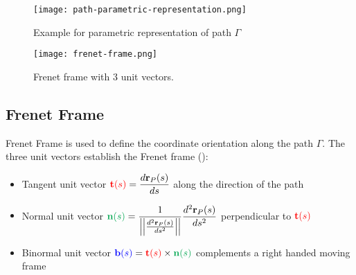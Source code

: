 \begin{figure}[hbt!]
	\centering
	\begin{minipage}{0.45\textwidth}
		\centering
		\texttt{[image: path-parametric-representation.png]}
		\caption{Example for parametric representation of path $\Gamma$}
		\label{fig:path-parametric-representation}
	\end{minipage}\hfill
	\begin{minipage}{0.45\textwidth}
		\centering
		\texttt{[image: frenet-frame.png]}
		\caption{Frenet frame with 3 unit vectors.}
		\label{fig:frenet-frame}
	\end{minipage}
\end{figure}

\subsection{Frenet Frame}
Frenet Frame is used to define the coordinate orientation along the path $\Gamma$. The three unit vectors establish the Frenet frame ():
\begin{itemize}
	\item Tangent unit vector $\displaystyle {\color{red} \textbf{t}(s)} = \frac{d\textbf{r}_P(s)}{ds} $ along the direction of the path
	\item Normal unit vector $\displaystyle {\color{Green} \textbf{n}(s)} = \frac{1}{\left|\left| \frac{d^2 \textbf{r}_P(s)}{ds^2} \right| \right|} \frac{d^2 \textbf{r}_P(s)}{ds^2} $ perpendicular to ${\color{red} \textbf{t}(s)}$
	\item Binormal unit vector $\displaystyle {\color{blue} \textbf{b}(s)} = {\color{red} \textbf{t}(s)} \times {\color{Green} \textbf{n}(s)}$ complements a right handed moving frame
\end{itemize}

